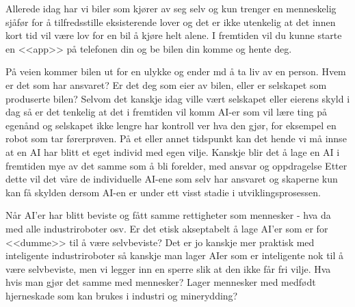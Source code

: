 Allerede idag har vi biler som kjører av seg selv og kun trenger en
menneskelig sjåfør for å tilfredsstille eksisterende lover og det er ikke
utenkelig at det innen kort tid vil være lov for en bil å kjøre helt alene. I fremtiden vil du kunne starte en <<app>> på telefonen din og be bilen din komme og hente deg.

På veien kommer bilen ut for en ulykke og ender md å ta liv av en person.
Hvem er det som har ansvaret? Er det deg som eier av bilen, eller er
selskapet som produserte bilen? Selvom det kanskje idag ville vært selskapet eller eierens skyld i dag så er det tenkelig at det i fremtiden vil komm AI-er som vil lære ting på egenånd og selskapet ikke lengre har kontroll ver hva den gjør, for eksempel en robot som tar førerprøven. På et eller annet tidspunkt kan det hende vi må innse at en AI har blitt et eget individ med
egen vilje. Kanskje blir det å lage en AI i fremtiden mye av det samme som å bli forelder, med ansvar og oppdragelse
Etter dette vil det våre de individuelle AI-ene som selv har ansvaret og
skaperne kun kan få skylden dersom AI-en er under ett visst stadie i utviklingsprosessen.

Når AI'er har blitt beviste og fått samme rettigheter som mennesker - hva da
med alle industriroboter osv. Er det etisk akseptabelt å lage AI'er som er for
<<dumme>> til å være selvbeviste? Det er jo kanskje mer praktisk med inteligente industriroboter så kanskje man
lager AIer som er inteligente nok til å være selvbeviste, men vi legger inn en
sperre slik at den ikke får fri vilje. Hva hvis man gjør det samme med
mennesker? Lager mennesker med medfødt hjerneskade som kan brukes i industri
og minerydding? 
